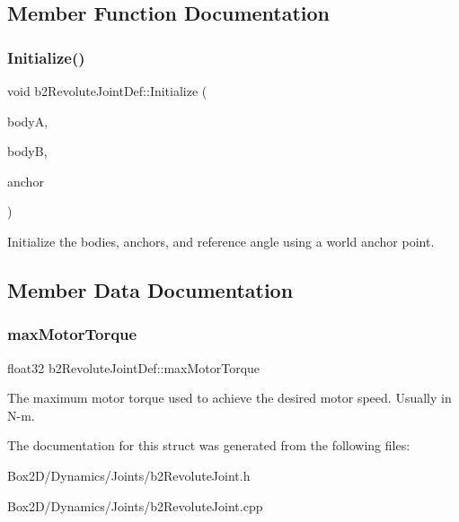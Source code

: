 \subsection{Member Function Documentation}
\mbox{\label{structb2_revolute_joint_def_a6401b2a663533415d032a525e4fa2806}} 
\subsubsection{\texorpdfstring{Initialize()}{Initialize()}}
{\footnotesize\ttfamily void b2\+Revolute\+Joint\+Def\+::\+Initialize (\begin{DoxyParamCaption}\item[{\hyperlink{classb2_body}{b2\+Body} $\ast$}]{bodyA,  }\item[{\hyperlink{classb2_body}{b2\+Body} $\ast$}]{bodyB,  }\item[{const \hyperlink{structb2_vec2}{b2\+Vec2} \&}]{anchor }\end{DoxyParamCaption})}

Initialize the bodies, anchors, and reference angle using a world anchor point. 

\subsection{Member Data Documentation}
\mbox{\label{structb2_revolute_joint_def_a9fc1b67fe6d1bc31f88cc2cfd681fe30}} 
\subsubsection{\texorpdfstring{max\+Motor\+Torque}{maxMotorTorque}}
{\footnotesize\ttfamily float32 b2\+Revolute\+Joint\+Def\+::max\+Motor\+Torque}

The maximum motor torque used to achieve the desired motor speed. Usually in N-\/m. 

The documentation for this struct was generated from the following files\+:\begin{DoxyCompactItemize}
\item 
Box2\+D/\+Dynamics/\+Joints/b2\+Revolute\+Joint.\+h\item 
Box2\+D/\+Dynamics/\+Joints/b2\+Revolute\+Joint.\+cpp\end{DoxyCompactItemize}
